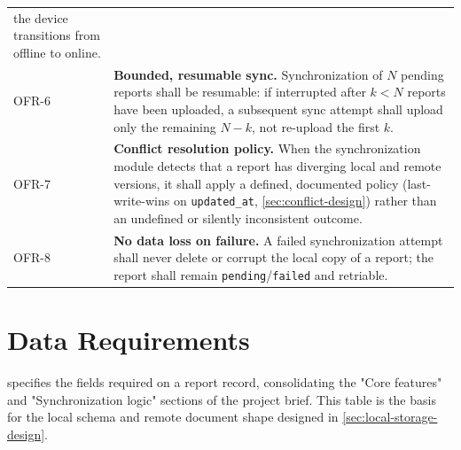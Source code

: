 \begin{longtable}{@{}p{1.6cm}p{9.0cm}@{}}
the device transitions from offline to online. \\
OFR-6 & \textbf{Bounded, resumable sync.} Synchronization of $N$ pending
reports shall be resumable: if interrupted after $k<N$ reports have been
uploaded, a subsequent sync attempt shall upload only the remaining
$N-k$, not re-upload the first $k$. \\
OFR-7 & \textbf{Conflict resolution policy.} When the synchronization
module detects that a report has diverging local and remote versions, it
shall apply a defined, documented policy (last-write-wins on
\texttt{updated\_at}, \cref{sec:conflict-design}) rather than an undefined
or silently inconsistent outcome. \\
OFR-8 & \textbf{No data loss on failure.} A failed synchronization attempt
shall never delete or corrupt the local copy of a report; the report shall
remain \texttt{pending}/\texttt{failed} and retriable. \\
\bottomrule
\end{longtable}

\section{Data Requirements}
\label{sec:data-req}

 specifies the fields required on a report record,
consolidating the "Core features" and "Synchronization logic" sections of
the project brief. This table is the basis for the local schema and remote
document shape designed in \cref{sec:local-storage-design}.

